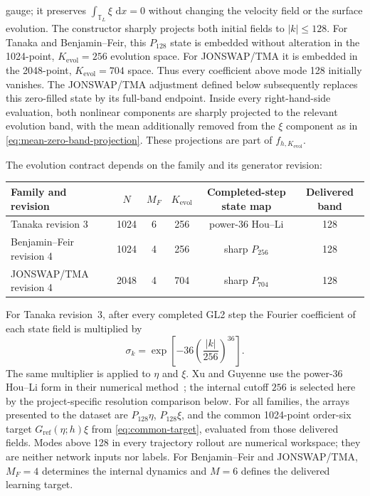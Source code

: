 \documentclass[11pt]{article}
\newcommand{\T}{\mathbb T}
\newcommand{\dd}{\,\mathrm d}
\begin{document}
gauge; it preserves $\int_{\T_L}\xi\,\dd x=0$ without changing the velocity
field or the surface evolution.
The constructor sharply projects both initial fields to $|k|\leq128$.  For
Tanaka and Benjamin--Feir, this $P_{128}$ state is embedded without alteration
in the 1024-point, $K_{\mathrm{evol}}=256$ evolution space.  For JONSWAP/TMA
it is embedded in the 2048-point, $K_{\mathrm{evol}}=704$ space.  Thus every
coefficient above mode 128 initially vanishes.  The JONSWAP/TMA
adjustment defined below subsequently replaces this zero-filled state by its
full-band endpoint.  Inside every right-hand-side evaluation, both
nonlinear components are sharply projected to the relevant evolution band,
with the mean additionally removed from the $\xi$ component as in
\eqref{eq:mean-zero-band-projection}.  These projections are part of
$f_{h,K_{\mathrm{evol}}}$.

The evolution contract depends on the family and its generator revision:
\begin{center}
\begin{tabular}{@{}lccccc@{}}
  \toprule
  Family and revision & $N$ & $M_F$ & $K_{\mathrm{evol}}$ & Completed-step state map
    & Delivered band \\
  \midrule
  Tanaka revision 3 & 1024 & 6 & 256 & power-36 Hou--Li & 128 \\
  Benjamin--Feir revision 4 & 1024 & 4 & 256 & sharp $P_{256}$ & 128 \\
  JONSWAP/TMA revision 4 & 2048 & 4 & 704 & sharp $P_{704}$ & 128 \\
  \bottomrule
\end{tabular}
\end{center}
For Tanaka revision~3, after every completed GL2 step the Fourier coefficient
of each state field is multiplied by
\begin{equation}
  \sigma_k=\exp\!\left[-36\left(\frac{|k|}{256}\right)^{36}\right].
  \label{eq:tanaka-production-hou-li}
\end{equation}
The same multiplier is applied to $\eta$ and $\xi$.  Xu and Guyenne use the
power-36 Hou--Li form in their numerical method~\cite{xu2009}; the internal
cutoff $256$ is selected here by the project-specific resolution comparison
below.  For all families, the arrays presented to the dataset are
$P_{128}\eta$, $P_{128}\xi$, and the common 1024-point order-six target
$G_{\mathrm{ref}}(\eta;h)\xi$ from \eqref{eq:common-target}, evaluated from
those delivered fields.  Modes above 128 in every trajectory rollout are
numerical workspace; they are neither network inputs nor labels.
For Benjamin--Feir and JONSWAP/TMA, \(M_F=4\) determines the internal dynamics
and \(M=6\) defines the delivered learning target.
\end{document}
